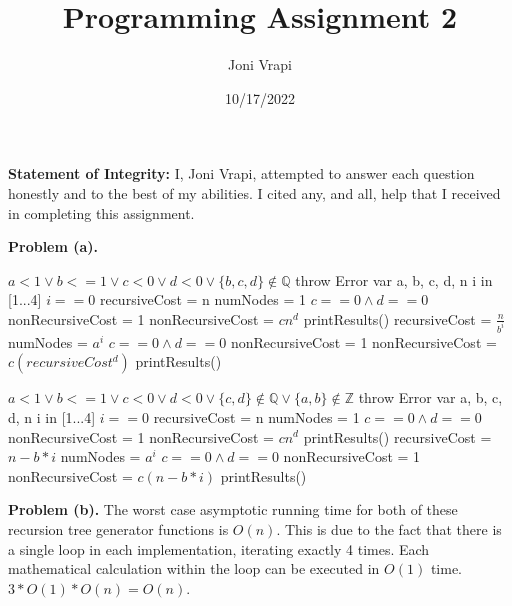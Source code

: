 \documentclass{article}
\title{Programming Assignment 2}
\author{Joni Vrapi}
\date{10/17/2022}
\begin{document}
\maketitle

\textbf{Statement of Integrity:} I, Joni Vrapi, attempted to answer each question honestly and to the best of my abilities. I cited any, and all, help that I received in completing this assignment.

\hfill

\textbf{Problem (a).}

\begin{codebox}
    \li \If $a < 1 \lor b <= 1 \lor c < 0 \lor d < 0 \lor \{b,c,d\} \not \in \mathbb{Q}$ \Then
    \li throw Error \End
    \li var a, b, c, d, n
    \li \For i in [1...4] \Do
    \li \If $i == 0$ \Then
        \li recursiveCost = n
        \li numNodes = 1
        \li \If $c == 0 \land d == 0$ \Then
            \li nonRecursiveCost = 1
            \li \Else 
            \li nonRecursiveCost = $cn^d$ \End
        \li printResults()
        \li \Else
        \li recursiveCost = $\frac{n}{b^i}$
        \li numNodes = $a^i$
        \li \If $c == 0 \land d == 0$ \Then
            \li nonRecursiveCost = 1
            \li \Else 
            \li nonRecursiveCost = $c(recursiveCost^d)$ \End
            \li printResults()
        \li \End
        \li \End
\end{codebox}

\hfill

\begin{codebox}
    \li \If $a < 1 \lor b <= 1 \lor c < 0 \lor d < 0 \lor \{c,d\} \not \in \mathbb{Q} \lor \{a,b\} \not \in \mathbb{Z}$ \Then
    \li throw Error \End
    \li var a, b, c, d, n
    \li \For i in [1...4] \Do
    \li \If $i == 0$ \Then
        \li recursiveCost = n
        \li numNodes = 1
        \li \If $c == 0 \land d == 0$ \Then
            \li nonRecursiveCost = 1
            \li \Else 
            \li nonRecursiveCost = $cn^d$ \End
        \li printResults()
        \li \Else
        \li recursiveCost = $n - b*i$
        \li numNodes = $a^i$
        \li \If $c == 0 \land d == 0$ \Then
            \li nonRecursiveCost = 1
            \li \Else 
            \li nonRecursiveCost = $c(n - b*i)$ \End
            \li printResults()
        \li \End
        \li \End
\end{codebox}

\textbf{Problem (b).} The worst case asymptotic running time for both of these recursion tree generator functions is $O(n)$. This is due to the fact that there is a single loop in each implementation, iterating exactly 4 times. Each mathematical calculation within the loop can be executed in $O(1)$ time. $3*O(1) * O(n) = O(n)$.
\end{document}
